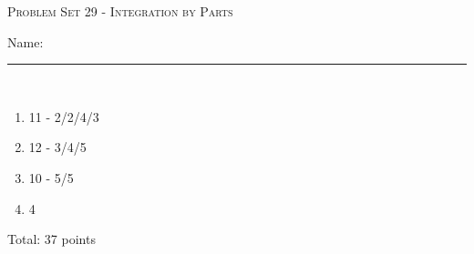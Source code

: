 \documentclass{article}
\begin{document}
\begin{center}
  \large\textsc{Problem Set 29 - Integration by Parts}
  
      \pspace{12pt}
  \begin{problemonly}\large Name: \rule{5cm}{0.15mm}\\ \end{problemonly}
\end{center}

\begin{grading}
    \begin{enumerate}
        \item 11 - 2/2/4/3
        \item 12 - 3/4/5
        \item 10 - 5/5
        \item 4
    \end{enumerate}
Total: 37 points
\end{grading}
\end{document}

